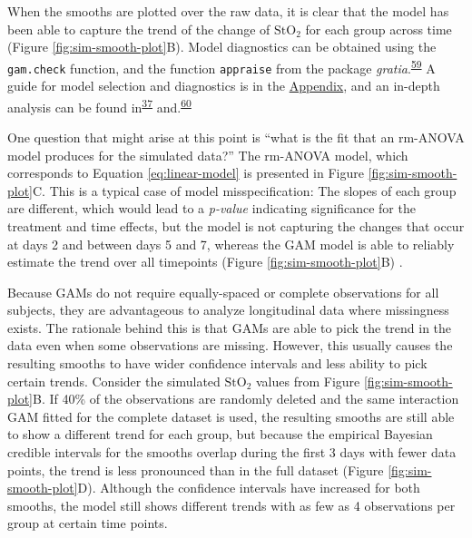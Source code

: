 \documentclass[
]{article}
\newcommand{\passthrough}[1]{#1}
\begin{document}
When the smooths are plotted over the raw data, it is clear that the model has been able to capture the trend of the change of \(\mbox{StO}_2\) for each group across time (Figure \ref{fig:sim-smooth-plot}B). Model diagnostics can be obtained using the \passthrough{\lstinline!gam.check!} function, and the function \passthrough{\lstinline!appraise!} from the package \emph{gratia}.\textsuperscript{\protect\hyperlink{ref-gratia}{59}} A guide for model selection and diagnostics is in the \protect\hyperlink{workflow}{Appendix}, and an in-depth analysis can be found in\textsuperscript{\protect\hyperlink{ref-wood2017}{37}} and.\textsuperscript{\protect\hyperlink{ref-harezlak2018}{60}}

One question that might arise at this point is ``what is the fit that an rm-ANOVA model produces for the simulated data?'' The rm-ANOVA model, which corresponds to Equation \eqref{eq:linear-model} is presented in Figure \ref{fig:sim-smooth-plot}C. This is a typical case of model misspecification: The slopes of each group are different, which would lead to a \emph{p-value} indicating significance for the treatment and time effects, but the model is not capturing the changes that occur at days 2 and between days 5 and 7, whereas the GAM model is able to reliably estimate the trend over all timepoints (Figure \ref{fig:sim-smooth-plot}B) .

Because GAMs do not require equally-spaced or complete observations for all subjects, they are advantageous to analyze longitudinal data where missingness exists. The rationale behind this is that GAMs are able to pick the trend in the data even when some observations are missing. However, this usually causes the resulting smooths to have wider confidence intervals and less ability to pick certain trends. Consider the simulated \(\mbox{StO}_2\) values from Figure \ref{fig:sim-smooth-plot}B. If 40\% of the observations are randomly deleted and the same interaction GAM fitted for the complete dataset is used, the resulting smooths are still able to show a different trend for each group, but because the empirical Bayesian credible intervals for the smooths overlap during the first 3 days with fewer data points, the trend is less pronounced than in the full dataset (Figure \ref{fig:sim-smooth-plot}D). Although the confidence intervals have increased for both smooths, the model still shows different trends with as few as 4 observations per group at certain time points.
\end{document}
